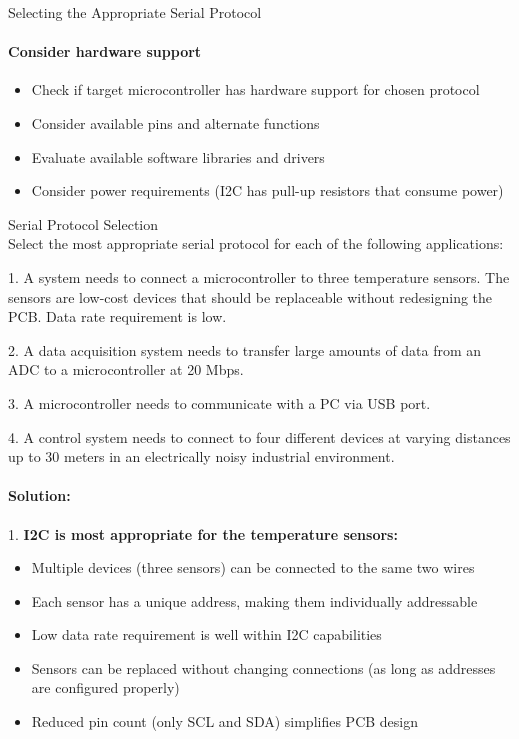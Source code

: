 \begin{KR}{Selecting the Appropriate Serial Protocol}
\paragraph{Consider hardware support}
\begin{itemize}
    \item Check if target microcontroller has hardware support for chosen protocol
    \item Consider available pins and alternate functions
    \item Evaluate available software libraries and drivers
    \item Consider power requirements (I2C has pull-up resistors that consume power)
\end{itemize}
\end{KR}

\begin{example2}{Serial Protocol Selection}\\
Select the most appropriate serial protocol for each of the following applications:

1. A system needs to connect a microcontroller to three temperature sensors. The sensors are low-cost devices that should be replaceable without redesigning the PCB. Data rate requirement is low.

2. A data acquisition system needs to transfer large amounts of data from an ADC to a microcontroller at 20 Mbps.

3. A microcontroller needs to communicate with a PC via USB port.

4. A control system needs to connect to four different devices at varying distances up to 30 meters in an electrically noisy industrial environment.

\tcblower
\paragraph{Solution:}

1. \textbf{I2C is most appropriate for the temperature sensors:}
   \begin{itemize}
     \item Multiple devices (three sensors) can be connected to the same two wires
     \item Each sensor has a unique address, making them individually addressable
     \item Low data rate requirement is well within I2C capabilities
     \item Sensors can be replaced without changing connections (as long as addresses are configured properly)
     \item Reduced pin count (only SCL and SDA) simplifies PCB design
   \end{itemize}


\end{example2}
